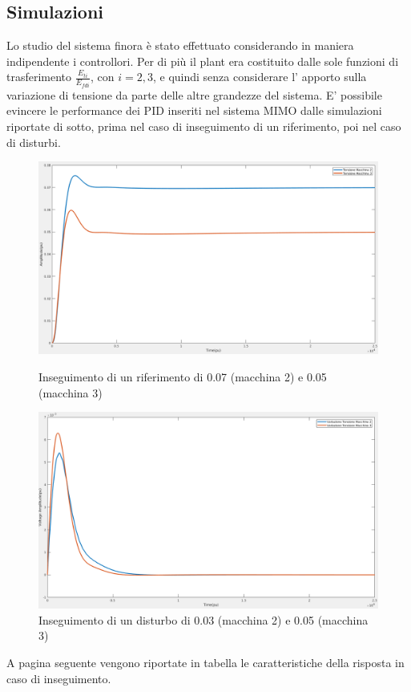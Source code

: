 \documentclass[Lau,noexaminfo]{sapthesis}
\begin{document}
	\subsection{Simulazioni}
	Lo studio del sistema finora è stato effettuato considerando in maniera indipendente i controllori. Per di più il plant era costituito dalle sole funzioni di trasferimento $\frac{E_{ti}}{E_{fdi}}$, con $i=2,3$, e quindi senza considerare l' apporto sulla variazione di tensione da parte delle altre grandezze del sistema. E' possibile evincere le performance dei PID inseriti nel sistema MIMO dalle simulazioni riportate di sotto, prima nel caso di inseguimento di un riferimento, poi nel caso di disturbi.
	\begin{figure}[h]
		\centering
		\includegraphics[scale=0.26]{simulazione_riferimento}
		\caption{Inseguimento di un riferimento di 0.07 (macchina 2) e 0.05 (macchina 3)}
		\includegraphics[scale=0.26]{simulazione_disturbo}
		\caption{Inseguimento di un disturbo di 0.03 (macchina 2) e 0.05 (macchina 3)}
	\end{figure}
	A pagina seguente vengono riportate in tabella le caratteristiche della risposta in caso di inseguimento.\\
\end{document}
